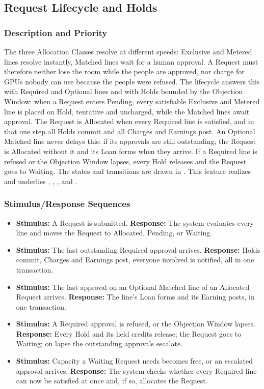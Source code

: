 \subsection{Request Lifecycle and Holds}\label{feat:lifecycle}

\subsubsection{Description and Priority}
The three Allocation Classes resolve at different speeds: Exclusive and Metered lines resolve instantly, Matched lines wait for a human approval. A Request must therefore neither lose the room while the people are approved, nor charge for GPUs nobody can use because the people were refused. The lifecycle answers this with Required and Optional lines and with Holds bounded by the Objection Window: when a Request enters Pending, every satisfiable Exclusive and Metered line is placed on Hold, tentative and uncharged, while the Matched lines await approval. The Request is Allocated when every Required line is satisfied, and in that one step all Holds commit and all Charges and Earnings post. An Optional Matched line never delays this: if its approvals are still outstanding, the Request is Allocated without it and its Loan forms when they arrive. If a Required line is refused or the Objection Window lapses, every Hold releases and the Request goes to Waiting. The states and transitions are drawn in . This feature realizes  and underlies , , , and . 

\subsubsection{Stimulus/Response Sequences}
\begin{itemize}
  \item \textbf{Stimulus:} A Request is submitted. \textbf{Response:} The system evaluates every line and moves the Request to Allocated, Pending, or Waiting.
  \item \textbf{Stimulus:} The last outstanding Required approval arrives. \textbf{Response:} Holds commit, Charges and Earnings post, everyone involved is notified, all in one transaction.
  \item \textbf{Stimulus:} The last approval on an Optional Matched line of an Allocated Request arrives. \textbf{Response:} The line's Loan forms and its Earning posts, in one transaction.
  \item \textbf{Stimulus:} A Required approval is refused, or the Objection Window lapses. \textbf{Response:} Every Hold and its held credits release; the Request goes to Waiting; on lapse the outstanding approvals escalate.
  \item \textbf{Stimulus:} Capacity a Waiting Request needs becomes free, or an escalated approval arrives. \textbf{Response:} The system checks whether every Required line can now be satisfied at once and, if so, allocates the Request.
\end{itemize}

